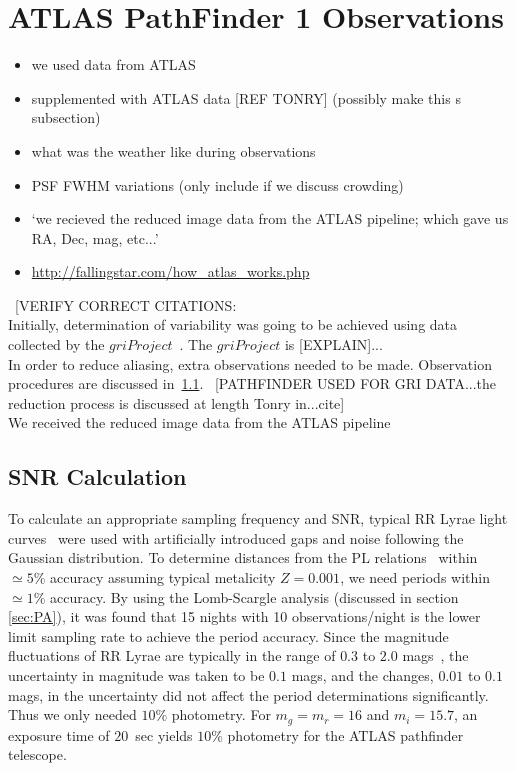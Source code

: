 \documentclass[aps,prb,twocolumn,superscriptaddress]{revtex4-1}
\begin{document}
\section{ATLAS PathFinder 1 Observations}
\begin{itemize}
	\item{} we used data from ATLAS
	\item{} supplemented with ATLAS data [REF TONRY] (possibly make this s subsection)
	\item{} what was the weather like during observations
	\item{} PSF FWHM variations (only include if we discuss crowding)
	\item{} `we recieved the reduced image data from the ATLAS pipeline; which gave us RA, Dec, mag, etc...'
	\item{}\url{http://fallingstar.com/how_atlas_works.php}
\end{itemize}


~[VERIFY CORRECT CITATIONS:\\%
Initially, determination of variability was going to be achieved using data collected by the $gri Project$~\cite{gri}.  The $gri Project$ is [EXPLAIN]...\\
In order to reduce aliasing, extra observations needed to be made.  Observation procedures are discussed in~\cref{sec:data}.
~[PATHFINDER USED FOR GRI DATA...the reduction process is discussed at length Tonry in...cite]\\
We received the reduced image data from the ATLAS pipeline~\cite{PSpipe}~\cite{tonrypipe}


\subsection{SNR Calculation}\label{sec:data}

To calculate an appropriate sampling frequency and SNR, typical RR Lyrae light curves~\cite{RRLyrae} were used with artificially introduced gaps and noise following the Gaussian distribution. To determine distances from the PL relations~\citep{PL} within $\simeq5\%$ accuracy assuming typical metalicity $Z=0.001$, we need periods within $\simeq1\%$ accuracy. By using the Lomb-Scargle analysis (discussed in section \ref{sec:PA}), it was found that 15 nights with 10 observations/night is the lower limit sampling rate to achieve the period accuracy. Since the magnitude fluctuations of RR Lyrae are typically in the range of $0.3$ to $2.0$ mags~\cite{Modern}, the uncertainty in magnitude was taken to be $0.1$ mags, and the changes, $0.01$ to $0.1$ mags, in the uncertainty did not affect the period determinations significantly. Thus we only needed $10\%$ photometry. For $m_g = m_r = 16$ and $m_i = 15.7$, an exposure time of $20$~sec yields $10\%$ photometry for the ATLAS pathfinder telescope.
\end{document}
